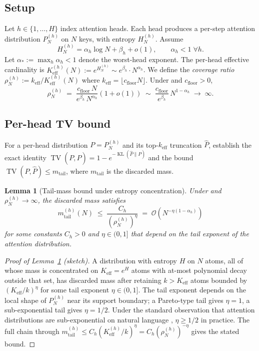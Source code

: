 \documentclass[11pt]{article}
\newtheorem{lemma}[theorem]{Lemma}
\theoremstyle{definition}
\theoremstyle{remark}
\theoremstyle{plain}
\DeclareMathOperator{\TV}{TV}
\DeclareMathOperator{\KL}{KL}
\newcommand{\bigO}{\mathcal{O}}
\begin{document}
\subsection{Setup}
Let $h\in\{1,\dots,H\}$ index attention heads. Each head produces a per-step attention
distribution $P^{(h)}_N$ on $N$ keys, with entropy $H^{(h)}_N$. Assume
\begin{equation}\label{eq:per-head-alpha}
H^{(h)}_N=\alpha_h\log N+\beta_h+o(1),\qquad \alpha_h<1\;\forall h.
\end{equation}
Let $\alpha_*:=\max_h\alpha_h<1$ denote the worst-head exponent. The per-head
effective cardinality is $K^{(h)}_\text{eff}(N):=e^{H^{(h)}_N}\sim e^{\beta_h}\cdot N^{\alpha_h}$.
We define the \emph{coverage ratio} $\rho^{(h)}_N := k_\text{eff}/K^{(h)}_\text{eff}(N)$
where $k_\text{eff}=\lfloor c_{\text{floor}}N\rfloor$. Under 
and $c_{\text{floor}}>0$,
\[
\rho^{(h)}_N \;=\; \frac{c_{\text{floor}}\,N}{e^{\beta_h}\,N^{\alpha_h}}(1+o(1))
\;\sim\; \frac{c_{\text{floor}}}{e^{\beta_h}}\, N^{1-\alpha_h}\;\to\;\infty.
\]

\subsection{Per-head TV bound}

For a per-head distribution $P=P^{(h)}_N$ and its top-$k_\text{eff}$ truncation
$\hat P$, \citet[Thm.~1]{tvtopk2025} establish the exact identity
$\TV(P,\hat P)=1-e^{-\KL(\hat P\|P)}$ and the bound
$\TV(P,\hat P)\leq m_\text{tail}$, where $m_\text{tail}$ is the discarded mass.

\begin{lemma}[Tail-mass bound under entropy concentration]\label{lem:tail}
Under  and $\rho^{(h)}_N\to\infty$, the discarded mass
satisfies
\[
m^{(h)}_\text{tail}(N) \;\leq\; \frac{C_h}{(\rho^{(h)}_N)^\eta}
\;=\; \bigO(N^{-\eta(1-\alpha_h)})
\]
for some constants $C_h>0$ and $\eta\in(0,1]$ that depend on the tail
exponent of the attention distribution.
\end{lemma}

\begin{proof}[Proof of Lemma~\ref{lem:tail} (sketch)]
A distribution with entropy $H$ on $N$ atoms, all of whose mass is concentrated on
$K_\text{eff}=e^H$ atoms with at-most polynomial decay outside that set, has discarded
mass after retaining $k>K_\text{eff}$ atoms bounded by $(K_\text{eff}/k)^\eta$ for
some tail exponent $\eta\in(0,1]$. The tail exponent depends on the local shape of
$P^{(h)}_N$ near its support boundary; a Pareto-type tail gives $\eta=1$, a
sub-exponential tail gives $\eta=1/2$. Under the standard observation that
attention distributions are sub-exponential on natural language
\citep[§4]{seqev2025qaxis}, $\eta\geq 1/2$ in practice. The full chain through
$m^{(h)}_\text{tail}\leq C_h(K^{(h)}_\text{eff}/k)^\eta=C_h(\rho^{(h)}_N)^{-\eta}$
gives the stated bound.
\end{proof}
\end{document}
